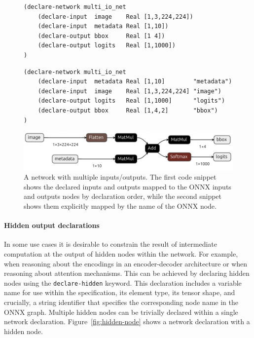 \begin{figure}[h!]
    \centering
    \begin{lstlisting}[style=lbnf]
(declare-network multi_io_net
    (declare-input  image    Real [1,3,224,224])
    (declare-input  metadata Real [1,10])
    (declare-output bbox     Real [1 4])
    (declare-output logits   Real [1,1000])
)\end{lstlisting}

    \begin{lstlisting}[style=lbnf]
(declare-network multi_io_net
    (declare-input  metadata Real [1,10]        "metadata")
    (declare-input  image    Real [1,3,224,224] "image")
    (declare-output logits   Real [1,1000]      "logits")
    (declare-output bbox     Real [1,4,2]       "bbox")
)\end{lstlisting}

    \vspace{0.5cm}
    \includegraphics[width=\textwidth]{imgs/multi_io_net.onnx.png}
    \caption{A network with multiple inputs/outputs. The first code snippet shows the declared inputs and outputs mapped to the ONNX inputs and outputs nodes by declaration order, while the second snippet shows them explicitly mapped by the name of the ONNX node.}
    \label{fig:multi-inputs-outputs}
\end{figure}


\paragraph{Hidden output declarations}
\label{sec:hidden-output-declarations}

In some use cases it is desirable to constrain the result of intermediate computation at the output of hidden nodes within the network. For example, when reasoning about the encodings in an encoder-decoder architecture or when reasoning about attention mechanisms. This can be achieved by declaring hidden nodes using the \texttt{declare-hidden} keyword. This declaration includes a variable name for use within the \vnnlib{} specification,  its element type, its tensor shape, and crucially, a string identifier that specifies the corresponding node name in the ONNX graph.  Multiple hidden nodes can be trivially declared within a single network declaration. Figure~\ref{fig:hidden-node} shows a \vnnlib{} network declaration with a hidden node.

